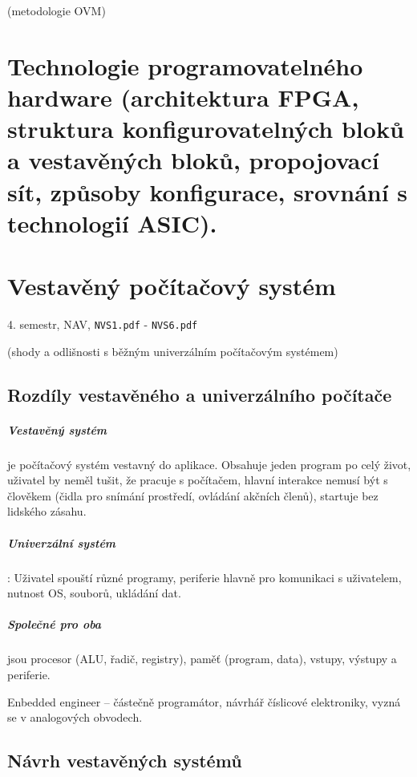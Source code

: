 \documentclass[a4paper, 11pt]{report}
\begin{document}
(metodologie OVM)

\chapter{Technologie programovatelného hardware (architektura FPGA, struktura konfigurovatelných bloků a vestavěných bloků, propojovací sít, způsoby konfigurace, srovnání s technologií ASIC).} \label{cha:57}
\chapter{Vestavěný počítačový systém} \label{cha:58}
4. semestr, NAV, \texttt{NVS1.pdf} - \texttt{NVS6.pdf}

(shody a odlišnosti s běžným univerzálním počítačovým systémem)

\section{Rozdíly vestavěného a univerzálního počítače}
\paragraph{Vestavěný systém} je počítačový systém vestavný do aplikace. Obsahuje jeden program po celý život, uživatel by neměl tušit, že pracuje s počítačem, hlavní interakce nemusí být s člověkem (čidla pro snímání prostředí, ovládání akčních členů), startuje bez lidského zásahu.

\paragraph{Univerzální systém}: Uživatel spouští různé programy, periferie hlavně pro komunikaci s uživatelem, nutnost OS, souborů, ukládání dat.

\paragraph{Společné pro oba} jsou procesor (ALU, řadič, registry), paměť (program, data), vstupy, výstupy a periferie.

Enbedded engineer -- částečně programátor, návrhář číslicové elektroniky, vyzná se v analogových obvodech.

\section{Návrh vestavěných systémů}
\end{document}
